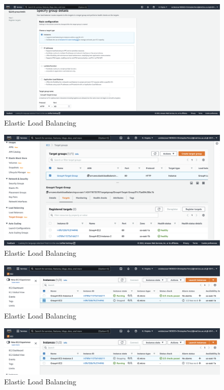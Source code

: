 \begin{figure}[!htbp]
    \centering
    \includegraphics[width=\textwidth]{resources/elb/elb-target-group-basic-config.png}
    \caption{Elastic Load Balancing}
    \label{fig:elb-target-group-basic-config}
\end{figure}
\begin{figure}[!htbp]
    \centering
    \includegraphics[width=\textwidth]{resources/elb/elb-target-group-created.png}
    \caption{Elastic Load Balancing}
    \label{fig:elb-target-group-create}
\end{figure}
\begin{figure}[!htbp]
    \centering
    \includegraphics[width=\textwidth]{resources/elb/elb-test-stopped-instance.png}
    \caption{Elastic Load Balancing}
    \label{fig:elb-stopped-instance}
\end{figure}
\begin{figure}[!htbp]
    \centering
    \includegraphics[width=\textwidth]{resources/elb/elb-test-stopped-instance-2.png}
    \caption{Elastic Load Balancing}
    \label{fig:elb-stopped-instance-2}
\end{figure}
